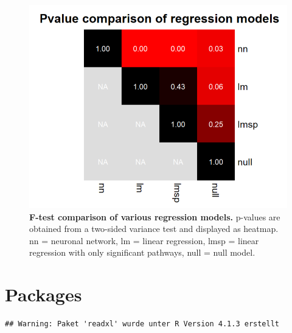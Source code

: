 \documentclass[
  11pt,
  parskip,
  oneside]{scrreprt}
\begin{document}
\begin{figure}

{\centering \includegraphics[width=0.3\linewidth]{figures/Regression comparison Pvalues IL36 genes} 

}

\caption{\textbf{F-test comparison of various regression models.} p-values are obtained from a two-sided variance test and displayed as heatmap. nn = neuronal network, lm = linear regression, lmsp = linear regression with only significant pathways, null = null model.}\label{fig:pval}
\end{figure}

\hypertarget{packages}{%
\section{Packages}\label{packages}}

\begin{verbatim}
## Warning: Paket 'readxl' wurde unter R Version 4.1.3 erstellt
\end{verbatim}
\end{document}
